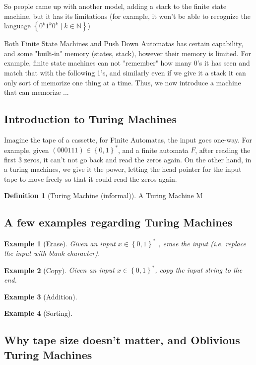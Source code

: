 \documentclass[a4paper,12pt]{article}
\theoremstyle{example}
\newtheorem{example}{Example}[section]
\theoremstyle{definition}
\newtheorem{definition}{Definition}[section]
\theoremstyle{remark}
\begin{document}
So people came up with another model, adding a stack to the finite state machine, but it has its limitations (for example, it won't be able to recognize the language $\left\{0^k1^k0^k \mid k \in \mathbb{N}\right\}$)

Both Finite State Machines and Push Down Automatas has certain capability, and some "built-in" memory (states, stack), however their memory is limited. For example, finite state machines can not "remember" how many 0's it has seen and match that with the following 1's, and similarly even if we give it a stack it can only sort of memorize one thing at a time. Thus, we now introduce a machine that can memorize ...

\subsection{Introduction to Turing Machines}
Imagine the tape of a cassette, for Finite Automatas, the input goes one-way. For example, given $(000111) \in \left\{0,1\right\}^{*}$, and a finite automata $F$, after reading the first 3 zeros, it can't not go back and read the zeros again. On the other hand, in a turing machines, we give it the power, letting the head pointer for the input tape to move freely so that it could read the zeros again.

\begin{definition}[Turing Machine (informal)]
A Turing Machine M 
\end{definition}
\subsection{A few examples regarding Turing Machines}


\begin{example}[Erase]
Given an input $x \in \left\{0,1\right\}^{*}$ , erase the input (i.e. replace the input with blank character).
\end{example}



\begin{example}[Copy]
Given an input $x \in \left\{0,1\right\}^{*}$, copy the input string to the end.
\end{example}


\begin{example}[Addition]

\end{example}

\begin{example}[Sorting]
\end{example}
\subsection{Why tape size doesn't matter, and Oblivious Turing Machines}
\end{document}
